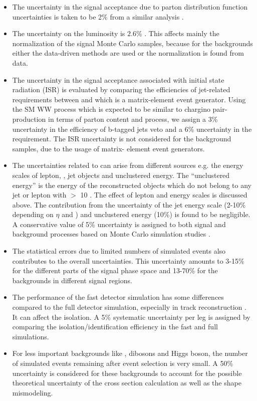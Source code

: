 \begin{itemize}
\item The uncertainty in the signal acceptance due to parton distribution function uncertainties 
  is taken to be 2\% from a similar analysis \cite{Khachatryan:2014qwa}.

\item The uncertainty on the luminosity  is $2.6\%$ \cite{CMS-PAS-LUM-13-001}.  This affects mainly the
  normalization of the signal Monte Carlo samples, because for the backgrounds  either  the data-driven methods are used or 
the normalization is found from data.

\item The uncertainty in the signal acceptance associated with initial state radiation (ISR)
is evaluated by comparing the efficiencies of jet-related requirements between \PYTHIA
 and \MADGRAPH which is a matrix-element event generator. Using the SM WW process which
 is expected to be similar to chargino pair-production in terms of parton content and process, we assign a 3\% uncertainty in 
the efficiency of  b-tagged jets veto and a 6\% uncertainty in the \deltaphi requirement. The ISR
 uncertainty is not considered for the background samples, due to the usage of matrix-
 element event generators.

\item The uncertainties related to \MPT can arise from different sources e.g.  the energy scales of lepton, \Tau, jet 
objects and unclustered energy.  The ``unclustered energy'' is the energy of the reconstructed objects which
 do not belong to any jet or lepton with \PT $>$ 10 \GeV. The effect of lepton and \Tau
 energy scales is discussed above. The contribution from the uncertainty of the jet energy scale (2-10\% depending on $\eta$  and \PT) and
 unclustered energy (10\%) is found to be negligible. A conservative value of 5\% uncertainty
 is assigned to both signal and background processes based on Monte
 Carlo simulation studies \cite{Khachatryan:2015kxa, Khachatryan:2014qwa}.

\item The statistical errors due to limited numbers of simulated events also contributes to the overall uncertainties. 
This uncertainty amounts to 3-15\% for the different parts of the signal phase space and 13-70\% for the backgrounds in different signal regions.

\item The performance of the fast detector simulation has some differences compared to the full detector simulation, especially in
 track reconstruction \cite{Khachatryan:2015kxa}. It can affect the \Tau isolation. A 5\% systematic uncertainty per
 \Tau leg is assigned by comparing the \Tau isolation/identification efficiency in the fast
 and full simulations. 


\item For less important backgrounds like \ttbar,  dibosons and Higgs boson, the number of simulated events remaining after event selection is very small. 
A 50\% uncertainty is considered for these backgrounds to account for the possible theoretical uncertainty of the
cross section calculation as well as the shape mismodeling.
\end{itemize}


